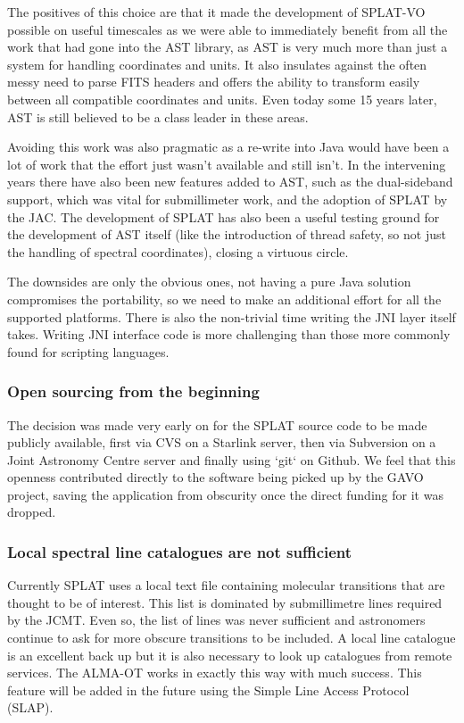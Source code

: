 \documentclass[final,authoryear,5p,times,twocolumn]{elsarticle}
\begin{document}
The positives of this choice are that it made the development of
SPLAT-VO possible on useful timescales as we were able to immediately
benefit from all the work that had gone into the AST library, as AST
is very much more than just a system for handling coordinates and
units. It also insulates against the often messy need to parse FITS
headers and offers the ability to transform easily between all
compatible coordinates and units. Even today some 15 years later, AST
is still believed to be a class leader in these areas.

Avoiding this work was also pragmatic as a re-write into Java would
have been a lot of work that the effort just wasn't available and
still isn't. In the intervening years there have also been new
features added to AST, such as the dual-sideband support, which was
vital for submillimeter work, and the adoption of SPLAT by the
JAC. The development of SPLAT has also been a useful testing ground
for the development of AST itself (like the introduction of thread
safety, so not just the handling of spectral coordinates), closing a
virtuous circle.

The downsides are only the obvious ones, not having a pure Java
solution compromises the portability, so we need to make an additional
effort for all the supported platforms. There is also the non-trivial
time writing the JNI layer itself takes. Writing JNI interface code is
more challenging than those more commonly found for scripting
languages.

\subsubsection{Open sourcing from the beginning}

The decision was made very early on for the SPLAT source code to be
made publicly available, first via CVS on a Starlink server, then via
Subversion on a Joint Astronomy Centre server and finally using `git`
on Github. We feel that this openness contributed directly to the
software being picked up by the GAVO project, saving the application
from obscurity once the direct funding for it was dropped.

\subsubsection{Local spectral line catalogues are not sufficient}

Currently SPLAT uses a local text file containing molecular
transitions that are thought to be of interest. This list is dominated
by submillimetre lines required by the JCMT. Even so, the list of
lines was never sufficient and astronomers continue to ask for more
obscure transitions to be included. A local line catalogue is an
excellent back up but it is also necessary to look up catalogues from
remote services. The ALMA-OT \citep{2013ASPC..475..373W} works in
exactly this way with much success. This feature will be added in the 
future using the Simple Line Access Protocol (SLAP).
\end{document}
